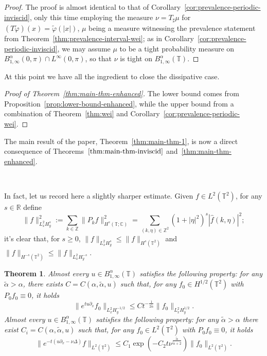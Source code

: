 \documentclass[11pt,oneside,reqno]{amsart}
\newcommand{\assign}{:=}
\newtheorem{theorem}{Theorem}[section]
\numberwithin{equation}{section}
\begin{document}
\begin{proof}
  The proof is almost identical to that of
  Corollary~\ref{cor:prevalence-periodic-inviscid}, only this time employing
  the measure $\nu = T_{\sharp} \mu$ for $(T \tilde{\varphi}) (x) =
  \tilde{\varphi} (| x |)$, $\mu$ being a measure witnessing the prevalence
  statement from Theorem~\ref{thm:prevalence-interval-wei}; as in
  Corollary~\ref{cor:prevalence-periodic-inviscid}, we may assume $\mu$ to be
  a tight probability measure on $B^{\alpha}_{1, \infty} (0, \pi) \cap
  L^{\infty} (0, \pi)$, so that $\nu$ is tight on $B^{\alpha}_{1, \infty}
  (\mathbb{T})$.
\end{proof}

At this point we have all the ingredient to close the dissipative case.

\begin{proof}[Proof of Theorem~\ref{thm:main-thm-enhanced}]
  The lower bound comes from Proposition~\ref{prop:lower-bound-enhanced},
  while the upper bound from a combination of Theorem~\ref{thm:wei} and
  Corollary~\ref{cor:prevalence-periodic-wei}.
\end{proof}

The main result of the paper, Theorem~\ref{thm:main-thm-1}, is now a direct
consequence of Theorems~$\ref{thm:main-thm-inviscid}$
and~\ref{thm:main-thm-enhanced}.

\

In fact, let us record here a slightly sharper estimate. Given $f \in L^2
(\mathbb{T}^2)$, for any $s \in \mathbb{R}$ define
\[ \| f \|_{L^2_x H^s_y}^2 \assign \sum_{k \in \mathbb{Z}} \| P_k f \|_{H^s
   (\mathbb{T}; \mathbb{C})}^2 = \sum_{(k, \eta) \in \mathbb{Z}^2} (1 + | \eta
   |^2)^s  | \hat{f} (k, \eta) |^2 ; \]
it's clear that, for $s \geqslant 0$, $\| f \|_{L^2_x H^s_y} \leqslant \| f
\|_{H^s (\mathbb{T}^2)}$ and $\| f \|_{H^{- s} (\mathbb{T}^2)} \leqslant \| f
\|_{L^2_x H^{- s}_y}$.

\begin{theorem}
  Almost every $u \in B^{\alpha}_{1, \infty} (\mathbb{T})$ satisfies the
  following property: for any $\tilde{\alpha} > \alpha$, there exists $C = C
  (\alpha, \tilde{\alpha}, u)$ such that, for any $f_0 \in H^{1 / 2}
  (\mathbb{T}^2)$ with $P_0 f_0 \equiv 0$, it holds
  \begin{equation}
    \| e^{t u \partial_x} f_0 \|_{{L^2_x}  H^{- 1 / 2}_y} \leqslant C t^{-
    \frac{1}{2 \tilde{\alpha}}} \| f_0 \|_{L^2_x H^{1 / 2}_y} .
    \label{eq:final-thm-eq1}
  \end{equation}
  Almost every $u \in B^{\alpha}_{1, \infty} (\mathbb{T})$ satisfies the
  following property: for any $\tilde{\alpha} > \alpha$ there exist $C_i = C
  (\alpha, \tilde{\alpha}, u)$ such that, for any $f_0 \in L^2 (\mathbb{T}^2)$
  with $P_0 f_0 \equiv 0$, it holds
  \begin{equation}
    \| e^{- t (u \partial_x - \nu \Delta)} f \|_{L^2 (\mathbb{T}^2)} \leqslant
    C_1 \exp \left( - C_2 t \nu^{\frac{\tilde{\alpha}}{\tilde{\alpha} + 2}}
    \right) \| f_0 \|_{L^2 (\mathbb{T}^2)} . \label{eq:final-thm-eq2}
  \end{equation}
\end{theorem}
\end{document}
